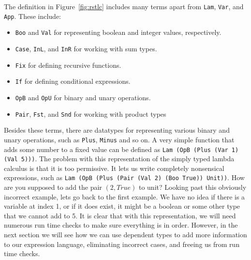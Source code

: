 The definition in Figure~\ref{fig:rstlc} includes many terms apart from \texttt{Lam}, \texttt{Var}, and \texttt{App}. These include:
\begin{itemize}
\item \texttt{Boo} and \texttt{Val} for representing boolean and integer values, respectively.
\item \texttt{Case}, \texttt{InL}, and \texttt{InR} for working with sum types.
\item \texttt{Fix} for defining recursive functions.
\item \texttt{If} for defining conditional expressions.
\item \texttt{OpB} and \texttt{OpU} for binary and unary operations.
\item \texttt{Pair}, \texttt{Fst}, and \texttt{Snd} for working with product types
\end{itemize}
Besides these terms, there are datatypes for representing various binary and unary operations, such as \texttt{Plus}, \texttt{Minus} and so on. A very simple function that adds some number to a fixed value can be defined as \texttt{Lam (OpB (Plus (Var 1) (Val 5)))}. The problem with this representation of the simply typed lambda calculus is that it is too permissive. It lets us write completely nonsensical expressions, such as \texttt{Lam (OpB (Plus (Pair (Val 2) (Boo True)) Unit))}. How are you supposed to add the pair $(2, True)$ to unit? Looking past this obviously incorrect example, lets go back to the first example. We have no idea if there is a variable at index 1, or if it does exist, it might be a boolean or some other type that we cannot add to 5. It is clear that with this representation, we will need numerous run time checks to make sure everything is in order. However, in the next section we will see how we can use dependent types to add more information to our expression language, eliminating incorrect cases, and freeing us from run time checks.
